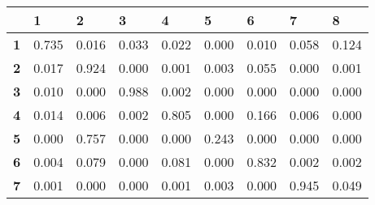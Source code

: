 \documentclass[10pt,twocolumn,letterpaper]{article}
\begin{document}
\begin{table}[h]
    \begin{tabular}{l|l|l|l|l|l|l|l|l|}
    \cline{2-9}
                                     & \textbf{1}                    & \textbf{2}                    & \textbf{3}                    & \textbf{4}                    & 5                             & \textbf{6}                    & \textbf{7}                    & \textbf{8}                    \\ \hline
    \multicolumn{1}{|l|}{\textbf{1}} & \cellcolor[HTML]{67FD9A}0.735 & 0.016                         & 0.033                         & 0.022                         & 0.000                         & 0.010                         & 0.058                         & 0.124                         \\ \hline
    \multicolumn{1}{|l|}{\textbf{2}} & 0.017                         & \cellcolor[HTML]{67FD9A}0.924 & 0.000                         & 0.001                         & 0.003                         & 0.055                         & 0.000                         & 0.001                         \\ \hline
    \multicolumn{1}{|l|}{\textbf{3}} & 0.010                         & 0.000                         & \cellcolor[HTML]{67FD9A}0.988 & 0.002                         & 0.000                         & 0.000                         & 0.000                         & 0.000                         \\ \hline
    \multicolumn{1}{|l|}{\textbf{4}} & 0.014                         & 0.006                         & 0.002                         & \cellcolor[HTML]{67FD9A}0.805 & 0.000                         & 0.166                         & 0.006                         & 0.000                         \\ \hline
    \multicolumn{1}{|l|}{\textbf{5}} & 0.000                         & 0.757                         & 0.000                         & 0.000                         & \cellcolor[HTML]{67FD9A}0.243 & 0.000                         & 0.000                         & 0.000                         \\ \hline
    \multicolumn{1}{|l|}{\textbf{6}} & 0.004                         & 0.079                         & 0.000                         & 0.081                         & 0.000                         & \cellcolor[HTML]{67FD9A}0.832 & 0.002                         & 0.002                         \\ \hline
    \multicolumn{1}{|l|}{\textbf{7}} & 0.001                         & 0.000                         & 0.000                         & 0.001                         & 0.003                         & 0.000                         & \cellcolor[HTML]{67FD9A}0.945 & 0.049                         \\ \hline

\end{tabular}
\end{table}
\end{document}
